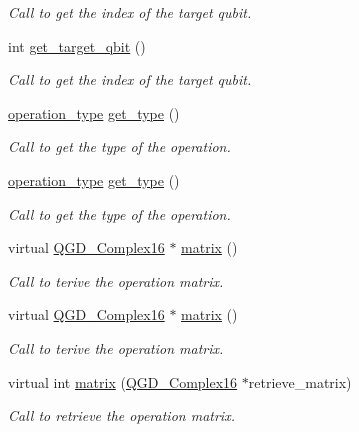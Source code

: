 \begin{DoxyCompactItemize}
\begin{DoxyCompactList}\small\item\em Call to get the index of the target qubit. \end{DoxyCompactList}\item 
int \hyperlink{class_operation_a55eee2ad4b90be085b1ec2ce018502f8}{get\+\_\+target\+\_\+qbit} ()
\begin{DoxyCompactList}\small\item\em Call to get the index of the target qubit. \end{DoxyCompactList}\item 
\hyperlink{operations_2include_2_operation_8h_ad99e62941c8e4b13e5fc45ecaaf65eff}{operation\+\_\+type} \hyperlink{class_operation_acc601a7a00616fd6e2a61f61e084afac}{get\+\_\+type} ()
\begin{DoxyCompactList}\small\item\em Call to get the type of the operation. \end{DoxyCompactList}\item 
\hyperlink{operations_2include_2_operation_8h_ad99e62941c8e4b13e5fc45ecaaf65eff}{operation\+\_\+type} \hyperlink{class_operation_acc601a7a00616fd6e2a61f61e084afac}{get\+\_\+type} ()
\begin{DoxyCompactList}\small\item\em Call to get the type of the operation. \end{DoxyCompactList}\item 
virtual \hyperlink{struct_q_g_d___complex16}{Q\+G\+D\+\_\+\+Complex16} $\ast$ \hyperlink{class_operation_a96d59ef5c87bc90a99f56319971885d6}{matrix} ()
\begin{DoxyCompactList}\small\item\em Call to terive the operation matrix. \end{DoxyCompactList}\item 
virtual \hyperlink{struct_q_g_d___complex16}{Q\+G\+D\+\_\+\+Complex16} $\ast$ \hyperlink{class_operation_acf7d1765143285ff73772ae860109988}{matrix} ()
\begin{DoxyCompactList}\small\item\em Call to terive the operation matrix. \end{DoxyCompactList}\item 
virtual int \hyperlink{class_operation_add11c6ea2626d8dbcbd00f328a8a8279}{matrix} (\hyperlink{struct_q_g_d___complex16}{Q\+G\+D\+\_\+\+Complex16} $\ast$retrieve\+\_\+matrix)
\begin{DoxyCompactList}\small\item\em Call to retrieve the operation matrix. \end{DoxyCompactList}\item 

\end{DoxyCompactItemize}
